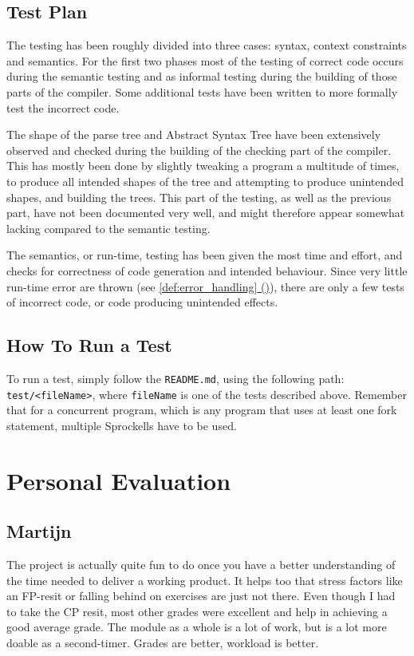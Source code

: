 \documentclass[twoside]{report}
\newcommand*{\fullref}[1]{\hyperref[{#1}]{\ref*{#1} (\nameref*{#1})}}
\begin{document}
\section{Test Plan}
The testing has been roughly divided into three cases: syntax, context constraints and semantics. For the first two phases most of the testing of correct code occurs during the semantic testing and as informal testing during the building of those parts of the compiler. Some additional tests have been written to more formally test the incorrect code.

The shape of the parse tree and Abstract Syntax Tree have been extensively observed and checked during the building of the checking part of the compiler. This has mostly been done by slightly tweaking a program a multitude of times, to produce all intended shapes of the tree and attempting to produce unintended shapes, and building the trees. This part of the testing, as well as the previous part, have not been documented very well, and might therefore appear somewhat lacking compared to the semantic testing.

The semantics, or run-time, testing has been given the most time and effort, and checks for correctness of code generation and intended behaviour. Since very little run-time error are thrown (see \fullref{def:error_handling}), there are only a few tests of incorrect code, or code producing unintended effects.


\section{How To Run a Test}
\label{how_to_run_a_test}
To run a test, simply follow the \texttt{README.md}, using the following path: \texttt{test/<fileName>}, where \texttt{fileName} is one of the tests described above. Remember that for a concurrent program, which is any program that uses at least one fork statement, multiple Sprockells have to be used.


\chapter{Personal Evaluation}
\label{personal_evaluation}
\section{Martijn}
The project is actually quite fun to do once you have a better understanding of the time needed to deliver a working product. It helps too that stress factors like an FP-resit or falling behind on exercises are just not there. Even though I had to take the CP resit, most other grades were excellent and help in achieving a good average grade. The module as a whole is a lot of work, but is a lot more doable as a second-timer. Grades are better, workload is better. 
\end{document}

